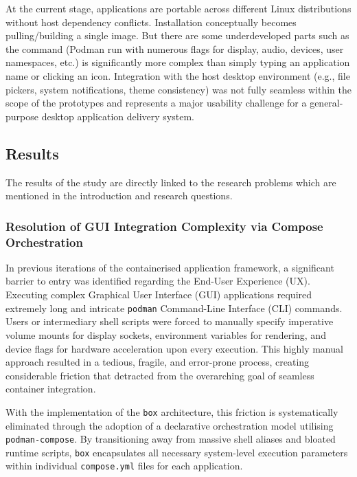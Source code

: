 \documentclass[journal,onecolumn]{IEEEtran}
\newcommand{\code}[1]{\texttt{#1}}
\begin{document}
At the current stage,  applications are portable across different Linux distributions without host dependency conflicts. Installation conceptually becomes pulling/building a single image. But there are some underdeveloped parts such as the command (Podman run with numerous flags for display, audio, devices, user namespaces, etc.) is significantly more complex than simply typing an application name or clicking an icon. Integration with the host desktop environment (e.g., file pickers, system notifications, theme consistency) was not fully seamless within the scope of the prototypes and represents a major usability challenge for a general-purpose desktop application delivery system.

\newpage
\subsection{Results}
The results of the study are directly linked to the research problems which are mentioned in the introduction and research
questions.
\subsubsection{Resolution of GUI Integration Complexity via Compose Orchestration}

In previous iterations of the containerised application framework, a significant barrier to entry was identified regarding the End-User Experience (UX). Executing complex Graphical User Interface (GUI) applications required extremely long and intricate \code{podman} Command-Line Interface (CLI) commands. Users or intermediary shell scripts were forced to manually specify imperative volume mounts for display sockets, environment variables for rendering, and device flags for hardware acceleration upon every execution. This highly manual approach resulted in a tedious, fragile, and error-prone process, creating considerable friction that detracted from the overarching goal of seamless container integration.

With the implementation of the \code{box} architecture, this friction is systematically eliminated through the adoption of a declarative orchestration model utilising \code{podman-compose}. By transitioning away from massive shell aliases and bloated runtime scripts, \code{box} encapsulates all necessary system-level execution parameters within individual \code{compose.yml} files for each application. 
\end{document}
